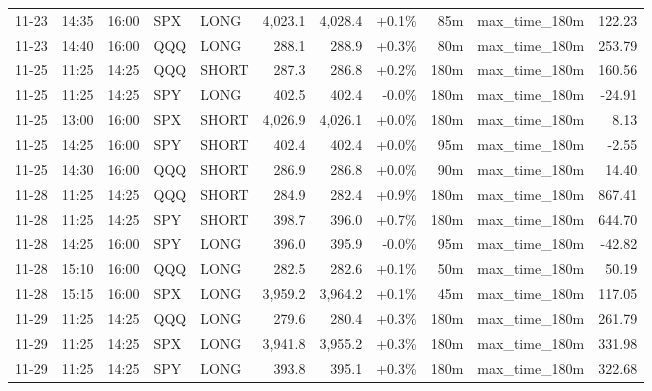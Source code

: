 \documentclass[11pt,a4paper,twoside]{article}
\begin{document}
\begin{center}
\begin{longtable}{>{\color{txtmain}}l l l l l r r r r >{\color{txtmain}}l r}
11-23 & 14:35 & 16:00 & SPX & LONG & 4,023.1 & 4,028.4 & \textcolor{wingreen}{+0.1\%} & 85m & max\_time\_180m & \textcolor{wingreen}{122.23} \\
11-23 & 14:40 & 16:00 & QQQ & LONG & 288.1 & 288.9 & \textcolor{wingreen}{+0.3\%} & 80m & max\_time\_180m & \textcolor{wingreen}{253.79} \\
11-25 & 11:25 & 14:25 & QQQ & SHORT & 287.3 & 286.8 & \textcolor{wingreen}{+0.2\%} & 180m & max\_time\_180m & \textcolor{wingreen}{160.56} \\
11-25 & 11:25 & 14:25 & SPY & LONG & 402.5 & 402.4 & \textcolor{lossred}{-0.0\%} & 180m & max\_time\_180m & \textcolor{lossred}{-24.91} \\
11-25 & 13:00 & 16:00 & SPX & SHORT & 4,026.9 & 4,026.1 & \textcolor{wingreen}{+0.0\%} & 180m & max\_time\_180m & \textcolor{wingreen}{8.13} \\
11-25 & 14:25 & 16:00 & SPY & SHORT & 402.4 & 402.4 & \textcolor{wingreen}{+0.0\%} & 95m & max\_time\_180m & \textcolor{lossred}{-2.55} \\
11-25 & 14:30 & 16:00 & QQQ & SHORT & 286.9 & 286.8 & \textcolor{wingreen}{+0.0\%} & 90m & max\_time\_180m & \textcolor{wingreen}{14.40} \\
11-28 & 11:25 & 14:25 & QQQ & SHORT & 284.9 & 282.4 & \textcolor{wingreen}{+0.9\%} & 180m & max\_time\_180m & \textcolor{wingreen}{867.41} \\
11-28 & 11:25 & 14:25 & SPY & SHORT & 398.7 & 396.0 & \textcolor{wingreen}{+0.7\%} & 180m & max\_time\_180m & \textcolor{wingreen}{644.70} \\
11-28 & 14:25 & 16:00 & SPY & LONG & 396.0 & 395.9 & \textcolor{lossred}{-0.0\%} & 95m & max\_time\_180m & \textcolor{lossred}{-42.82} \\
11-28 & 15:10 & 16:00 & QQQ & LONG & 282.5 & 282.6 & \textcolor{wingreen}{+0.1\%} & 50m & max\_time\_180m & \textcolor{wingreen}{50.19} \\
11-28 & 15:15 & 16:00 & SPX & LONG & 3,959.2 & 3,964.2 & \textcolor{wingreen}{+0.1\%} & 45m & max\_time\_180m & \textcolor{wingreen}{117.05} \\
11-29 & 11:25 & 14:25 & QQQ & LONG & 279.6 & 280.4 & \textcolor{wingreen}{+0.3\%} & 180m & max\_time\_180m & \textcolor{wingreen}{261.79} \\
11-29 & 11:25 & 14:25 & SPX & LONG & 3,941.8 & 3,955.2 & \textcolor{wingreen}{+0.3\%} & 180m & max\_time\_180m & \textcolor{wingreen}{331.98} \\
11-29 & 11:25 & 14:25 & SPY & LONG & 393.8 & 395.1 & \textcolor{wingreen}{+0.3\%} & 180m & max\_time\_180m & \textcolor{wingreen}{322.68} \\

\end{longtable}
\end{center}
\end{document}

